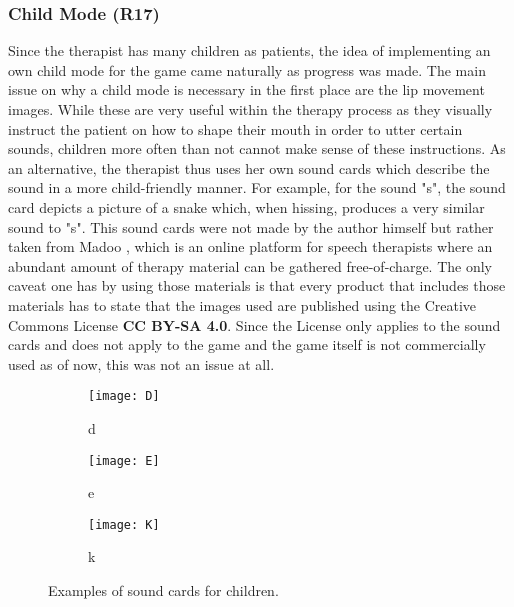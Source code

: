 \documentclass[draft,final]{vutinfth} %
\begin{document}
\subsubsection{Child Mode (R17)}
Since the therapist has many children as patients, the idea of implementing an own child mode for the game came naturally as progress was made. The main issue on why a child mode is necessary in the first place are the lip movement images. While these are very useful within the therapy process as they visually instruct the patient on how to shape their mouth in order to utter certain sounds, children more often than not cannot make sense of these instructions. As an alternative, the therapist thus uses her own sound cards which describe the sound in a more child-friendly manner. For example, for the sound "s", the sound card depicts a picture of a snake which, when hissing, produces a very similar sound to "s".
This sound cards were not made by the author himself but rather taken from Madoo \cite{Madoo}, which is an online platform for speech therapists where an abundant amount of therapy material can be gathered free-of-charge. The only caveat one has by using those materials is that every product that includes those materials has to state that the images used are published using the Creative Commons License \textbf{CC BY-SA 4.0}\cite{License}. Since the License only applies to the sound cards and does not apply to the game and the game itself is not commercially used as of now, this was not an issue at all.
\begin{figure}
\begin{subfigure}{.33\textwidth}
  \centering
  \texttt{[image: D]}
  \caption{d}
\end{subfigure}%
\begin{subfigure}{.33\textwidth}
  \centering
  \texttt{[image: E]}
  \caption{e}
\end{subfigure}
\begin{subfigure}{.33\textwidth}
  \centering
  \texttt{[image: K]}
  \caption{k}
\end{subfigure}
\caption{Examples of sound cards for children\cite{childImages}.}
\end{figure}
\end{document}
